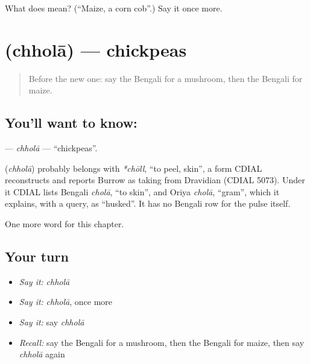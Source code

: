 \begin{tcolorbox}[breakable,colback=teal!4,colframe=teal!35!black,title={Before you move on}]
What does  mean? (\textquotedblleft{}Maize, a corn cob\textquotedblright{}.) Say it once more.
\end{tcolorbox}
\section[\texorpdfstring{\bn{ছোলা} (chholā)}{ছোলা (chholā)}]{ (chholā) — chickpeas}

\label{lesson:BN-C232-chhola}



\begin{quote}
Before the new one: say the Bengali for a mushroom, then the Bengali for maize.
\end{quote}

\subsection*{You'll want to know: }
\textbf{} — \emph{chholā} — \textquotedblleft{}chickpeas\textquotedblright{}.

\begin{cousinweb}
\textbf{} (\emph{chholā}) probably belongs with \emph{*chōll}, \textquotedblleft{}to peel, skin\textquotedblright{}, a form CDIAL reconstructs and reports Burrow as taking from Dravidian (CDIAL 5073). Under it CDIAL lists Bengali \emph{cholā}, \textquotedblleft{}to skin\textquotedblright{}, and Oriya \emph{cholā}, \textquotedblleft{}gram\textquotedblright{}, which it explains, with a query, as \textquotedblleft{}husked\textquotedblright{}. It has no Bengali row for the pulse itself.
\end{cousinweb}

\begin{grammarlens}[title={What you've built}]
One more word for this chapter.
\end{grammarlens}

\subsection*{Your turn}
\begin{itemize}
\raggedright
  \item \emph{Say it:} \emph{chholā}
  \item \emph{Say it:} \emph{chholā}, once more
  \item \emph{Say it:} say \emph{chholā}
  \item \emph{Recall:} say the Bengali for a mushroom, then the Bengali for maize, then say \emph{chholā} again
\end{itemize}

